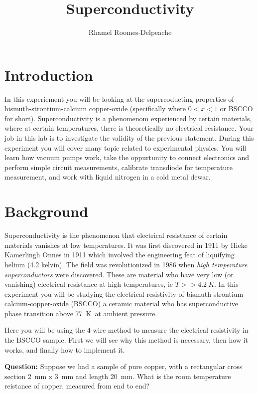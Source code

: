 \documentclass{apl-guide}
\title{Superconductivity}
\author{Rhamel Roomes-Delpeache}
\newcommand{\K}{\SI{77}{\kelvin}}
\begin{document}
\maketitle
\tableofcontents
\section{Introduction}
In this experiement you will be looking at the supercoducting properties of
bismuth-strontium-calcium copper-oxide (specifically  where
$0<x<1$ or BSCCO for short). Superconductivity is a
phenomenom experienced by certain materials, where at certain temperatures,
there is theoretically no electrical resistance. Your job in this lab is to
investigate the validity of the previous statement. During this experiment you
will cover many topic related to experimental physics. You will learn how vacuum
pumps work, take the oppurtunity to connect electronics and perform simple
circuit measurements, calibrate transdiode for temperature measurement, and work
with liquid nitrogen in a cold metal dewar. 

\section{Background}
Superconductivity is the phenomenon that electrical resistance of certain
materials vanishes at low temperatures. It was first discovered in 1911 by Hieke
Kamerlingh Onnes in 1911 which involved the engineering feat of liquifying 
helium (4.2 kelvin). 
The field was revolutionized in 1986 when \emph{high temperature superconductors}
were discovered. These are material who have very low (or vanishing) electrical
resistance at high temperatures, ie $T >> \SI{4.2}{K}$. In this
experiment you will be studying the electrical resistivity of
bismuth-strontium-calcium-copper-oxide (BSCCO) a ceramic material who has
superconductive phase transition above \K \ at ambient pressure.

Here you will be using the 4-wire method to measure the electrical resistivity in
the BSCCO sample. First we will see why this method is necessary, then how it
works, and finally how to implement it. 

\vspace{10pt}
\begin{minipage}{0.8\textwidth}
\textbf{Question:} Suppose we had a sample of pure copper, with a rectangular
cross section \SI{2}{\mm} x \SI{3}{\mm} and length \SI{20}{\mm}. What is the
room temperature reistance of copper, measured from end to end?
\end{minipage}
\end{document}
